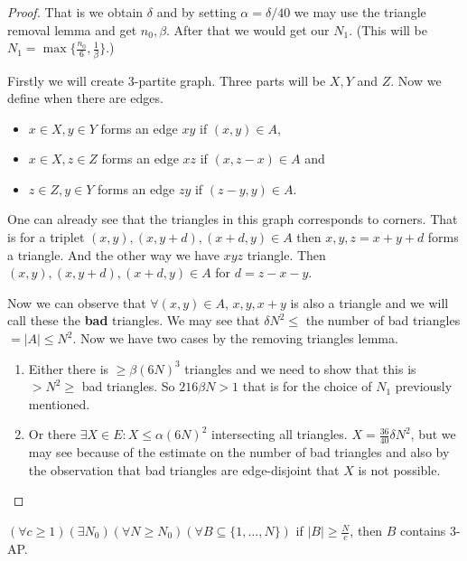 \begin{proof}
	That is we obtain $\delta$ and by setting $\alpha = \delta/40$ we may use the triangle removal lemma and get $n_0, \beta$. After that we would get our $N_1$. (This will be $N_1 = \max \{\frac{n_0}{6}, \frac{1}{\beta}\}$.)
	
	Firstly we will create 3-partite graph. Three parts will be $X,Y$ and $Z$. Now we define when there are edges.
	
	\begin{itemize}
		\item $x \in X, y \in Y$ forms an edge $xy$ if $(x,y) \in A$,
		\item $x \in X, z \in Z$ forms an edge $xz$ if $(x,z-x) \in A$ and
		\item $z \in Z, y \in Y$ forms an edge $zy$ if $(z-y,y) \in A$.
	\end{itemize}
	
	One can already see that the triangles in this graph corresponds to corners. That is for a triplet $(x,y), (x, y +d), (x+d,y) \in A$ then $x,y,z=x+y+d$ forms a triangle. And the other way we have $xyz$ triangle. Then $(x,y), (x, y+d), (x+d,y) \in A$ for $d = z -x-y$.
	
	Now we can observe that $\forall (x,y) \in A$, $x,y, x+y$ is also a triangle and we will call these the \textbf{bad} triangles. We may see that $\delta N^2 \leq$ the number of bad triangles $= |A| \leq N^2$. Now we have two cases by the removing triangles lemma.
	
	\begin{enumerate}
		\item Either there is $\geq \beta (6N)^3$ triangles and we need to show that this is $> N^2 \geq$ bad triangles. So $216 \beta N > 1$ that is for the choice of $N_1$ previously mentioned.
		\item Or there $\exists X \in E: X \leq \alpha(6N)^2$ intersecting all triangles. $X = \frac{36}{40} \delta N^2$, but we may see because of the estimate on the number of bad triangles and also by the observation that bad triangles are edge-disjoint that $X$ is not possible.
	\end{enumerate}
\end{proof}


\begin{thm}[Róth]
	$(\forall c \geq 1) (\exists N_0) (\forall N \geq N_0) (\forall B \subseteq \{1, \dots, N\})$ if $|B| \geq \frac{N}{c}$, then $B$ contains 3-AP.
\end{thm}

